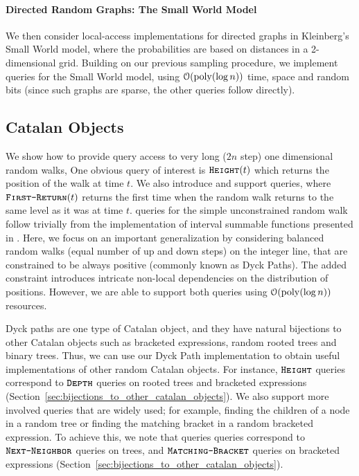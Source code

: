 \paragraph*{Directed Random Graphs: The Small World Model}
\label{par:directed_random_graphs}
We then consider local-access implementations for directed graphs in Kleinberg's Small World model,
where the probabilities are based on distances in a 2-dimensional grid.
Building on our previous sampling procedure, we implement  queries for the Small World model,
using $\mathcal{O}(\mathrm{poly}(\log n))$ time, space and random bits (since such graphs are sparse, the other queries follow directly).




\subsection{Catalan Objects}%
\label{sec:intro_catalan_objects}
We show how to provide query access to very long ($2n$ step) one dimensional random walks,
One obvious query of interest is $\texttt{\textsc{Height}}(t)$ which returns the position of the walk at time $t$.
We also introduce and support  queries, where $\texttt{\textsc{First-Return}}(t)$ returns
the first time when the random walk returns to the same level as it was at time $t$.
 queries for the simple unconstrained random walk
follow trivially from the implementation of interval summable functions presented in \cite{huge}.
Here, we focus on an important generalization by considering balanced random walks (equal number of up and down steps) on the integer line,
that are constrained to be always positive (commonly known as Dyck Paths).
The added constraint introduces intricate non-local dependencies on the distribution of positions.
However, we are able to support both queries using $\mathcal O(\mathrm{poly}(\log n))$ resources.

Dyck paths are one type of Catalan object, and they have natural bijections to other Catalan objects
such as bracketed expressions, random rooted trees and binary trees.
Thus, we can use our Dyck Path implementation to obtain useful implementations of other random Catalan objects.  For instance, $\texttt{\textsc{Height}}$ queries correspond to $\texttt{\textsc{Depth}}$ queries on rooted trees and bracketed expressions
(Section~\ref{sec:bijections_to_other_catalan_objects}).
We also support more involved queries that are widely used; for example, finding the children of a node in a random tree
or finding the matching bracket in a random bracketed expression.
To achieve this, we note that  queries queries correspond to $\texttt{\textsc{Next-Neighbor}}$ queries on trees,
and $\texttt{\textsc{Matching-Bracket}}$ queries on bracketed expressions (Section~\ref{sec:bijections_to_other_catalan_objects}).




